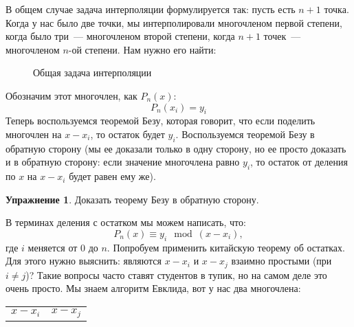 \documentclass[russian]{lecture-notes}
\theoremstyle{definition}
\newtheorem*{exercise}{Упражнение}
\begin{document}
	В общем случае задача интерполяции формулируется так: пусть есть $n+1$ точка. Когда у нас было две точки, мы интерполировали многочленом первой степени, когда было три~--- многочленом второй степени, когда $n+1$ точек~--- многочленом $n$-ой степени. Нам нужно его найти:
	\begin{figure}[H]
		\centering 
		\caption{\small Общая задача интерполяции}
	\end{figure}
	
	\noindent Обозначим этот многочлен, как $P_n(x)$:
	\[
		P_n(x_i) = y_i
	\]
	Теперь воспользуемся теоремой Безу, которая говорит, что если поделить многочлен на $x - x_i$, то остаток будет $y_i$. Воспользуемся теоремой Безу в обратную сторону (мы ее доказали только в одну сторону, но ее просто доказать и в обратную сторону: если значение многочлена равно $y_i$, то остаток от деления по $x$ на $x - x_i$ будет равен ему же). 
	
	\begin{exercise}
		Доказать теорему Безу в обратную сторону.
	\end{exercise}
	
	\noindent В терминах деления с остатком мы можем написать, что:
	\[
		P_n(x) \equiv y_i \mod{(x - x_i)},
	\]
	где $i$ меняется от $0$ до $n$. Попробуем применить китайскую теорему об остатках. Для этого нужно выяснить: являются $x - x_i$ и $x - x_j$ взаимно простыми (при $i \ne j$)? Такие вопросы часто ставят студентов в тупик, но на самом деле это очень просто. Мы знаем алгоритм Евклида, вот у нас два многочлена:
	\begin{table}[H]
		\centering
		\begin{tabular}{c|c}
			$x - x_i$ & $x - x_j$
		\end{tabular}
	\end{table}
	
\end{document}
